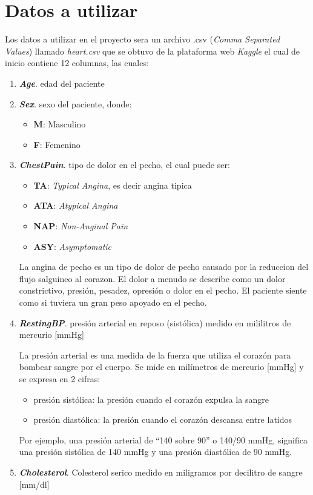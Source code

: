 \documentclass[12pt, letterpaper]{article}
\begin{document}
\section{Datos a utilizar}
Los datos a utilizar en el proyecto sera un archivo .csv 
(\textit{Comma Separated Values}) llamado \textit{heart.csv} 
que se obtuvo de la plataforma web \textit{Kaggle} \cite{dataset}
el cual de inicio contiene 12 columnas, las cuales:
\begin{enumerate}
    \item{\textbf{\textit{Age}}. edad del paciente} 
    \item{\textbf{\textit{Sex}}. sexo del paciente, donde:
    \begin{itemize}
        \item{\textbf{M}}: Masculino
        \item{\textbf{F}}: Femenino
    \end{itemize}
    }
    \item{\textbf{\textit{ChestPain}}. tipo de dolor en el pecho, el cual puede ser: 
    \begin{itemize}
        \item{\textbf{TA}}: \textit{Typical Angina}, es decir angina tipica
        \item{\textbf{ATA}}: \textit{Atypical Angina}
        \item{\textbf{NAP}}: \textit{Non-Anginal Pain}
        \item{\textbf{ASY}}: \textit{Asymptomatic}
    \end{itemize}
    La angina de pecho es un tipo de dolor de pecho causado por la reduccion del flujo
    salguineo al corazon. El dolor a menudo se describe como un dolor constrictivo, 
    presión, pesadez, opresión o dolor en el pecho. El paciente siente como si tuviera
    un gran peso apoyado en el pecho. \cite{angina}
    }
    \item{\textbf{\textit{RestingBP}}. presión arterial en reposo (sistólica)
    medido en mililitros de mercurio [mmHg]
    
    La presión arterial es una medida de la fuerza que utiliza el corazón para bombear
    sangre por el cuerpo. Se mide en milímetros de mercurio [mmHg] y se expresa en 2 cifras:
    \begin{itemize}
        \item{presión sistólica: la presión cuando el corazón expulsa la sangre}
        \item{presión diastólica: la presión cuando el corazón descansa entre latidos}
    \end{itemize}
    Por ejemplo, una presión arterial de \textquotedblleft{}140 sobre 90\textquotedblright{}
    o 140/90 mmHg, significa una presión sistólica de 140 mmHg y una presión diastólica
    de 90 mmHg. \cite{presion-arterial}
    }
    \item{\textbf{\textit{Cholesterol}}. Colesterol serico 
    medido en miligramos por decilitro de sangre [mm/dl]
    
}
\end{enumerate}
\end{document}
